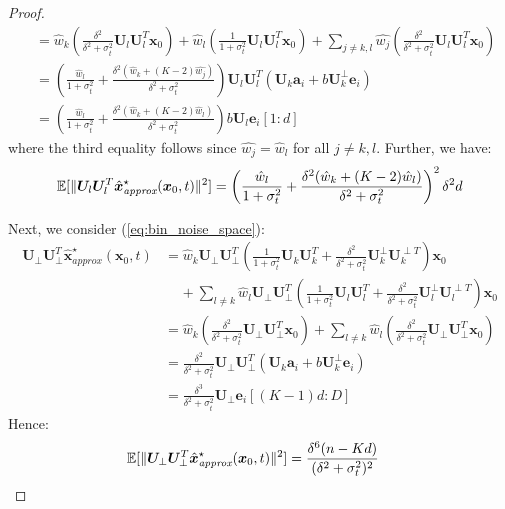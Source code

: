 \begin{proof}
\begin{align*}
        &= \hat{w}_k \left( \frac{\delta^2}{\delta^2 + \sigma_t^2} \bm U_l \bm U_l^T \bm x_0 \right) + \hat{w}_l \left( \frac{1}{1 + \sigma_t^2} \bm U_l \bm U_l^T \bm x_0\right) + \sum_{j \neq k,l}\hat{w_j} \left( \frac{\delta^2}{\delta^2 + \sigma_t^2} \bm U_l \bm U_l^T \bm x_0 \right) \\
        &= \left( \frac{\hat{w}_l}{1+\sigma_t^2} + \frac{\delta^2 (\hat{w}_k + (K-2)\hat{w_j})}{\delta^2 + \sigma_t^2}\right) \bm U_l \bm U_l^T (\bm U_k \bm a_i + b\bm U_k^{\perp} \bm e_i) \\
        &= \left( \frac{\hat{w}_l}{1+\sigma_t^2} + \frac{\delta^2 (\hat{w}_k + (K-2)\hat{w}_l)}{\delta^2 + \sigma_t^2}\right) b \bm U_l \bm e_i[1:d]
    \end{align*}
    where the third equality follows since $\hat{w_j} = \hat{w}_l$ for all $j \neq k,l$. Further, we have:
    \begin{align*}
        \operatorname{\mathbb{E}}[\| \bm U_l \bm U_l^T \hat{\bm x}_{\textit{approx}}^{\star}(\bm x_0, t) \|^2] = \left( \frac{\hat{w}_l}{1+\sigma_t^2} + \frac{\delta^2 (\hat{w}_k + (K-2)\hat{w}_l)}{\delta^2 + \sigma_t^2}\right)^2 \delta^2 d
    \end{align*}

    Next, we consider (\ref{eq:bin_noise_space}):
    \begin{align*}
        \bm U_{\perp} \bm U_{\perp}^T \hat{\bm x}_{\textit{approx}}^{\star}(\bm x_0, t) &= \hat{w}_k \bm U_{\perp} \bm U_{\perp}^T \left(\frac{1}{1+\sigma_t^2} \bm U_k \bm U_k^T + \frac{\delta^2}{\delta^2 + \sigma_t^2} \bm U_k^{\perp} \bm U_k^{\perp T} \right) \bm x_0 \\
        &\;\;\;\; + \sum_{l \neq k}\hat{w}_l \bm U_{\perp} \bm U_{\perp}^T \left(\frac{1}{1+\sigma_t^2} \bm U_l \bm U_l^T + \frac{\delta^2}{\delta^2 + \sigma_t^2} \bm U_l^{\perp} \bm U_l^{\perp T} \right) \bm x_0 \\
        &= \hat{w}_k \left(\frac{\delta^2}{\delta^2 + \sigma_t^2 } \bm U_{\perp} \bm U_{\perp}^T \bm x_0 \right) + \sum_{l \neq k}\hat{w}_l \left(\frac{\delta^2}{\delta^2 + \sigma_t^2} \bm U_{\perp} \bm U_{\perp}^T \bm x_0 \right) \\
        &= \frac{\delta^2}{\delta^2 + \sigma_t^2} \bm U_{\perp} \bm U_{\perp}^T (\bm U_k \bm a_i + b\bm U_k^{\perp} \bm e_i) \\
        &= \frac{\delta^3}{\delta^2 + \sigma_t^2} \bm U_{\perp} \bm e_i[(K-1)d:D]
    \end{align*}
    Hence:
    \begin{align*}
        \operatorname{\mathbb{E}}[\| \bm U_{\perp} \bm U_{\perp}^T \hat{\bm x}_{\textit{approx}}^{\star}(\bm x_0, t)\|^2] &= \frac{\delta^6 (n-Kd)}{(\delta^2 + \sigma_t^2)^2}
    \end{align*}


\end{proof}
